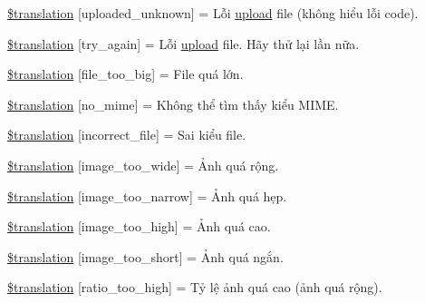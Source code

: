 \begin{DoxyCompactItemize}
\hyperlink{class_8upload_8vn___v_n_8php_a4a9168e922b827e6a28b5db1c00774ca}{\$translation} \mbox{[}\textquotesingle{}uploaded\+\_\+unknown\textquotesingle{}\mbox{]} = \textquotesingle{}Lỗi \hyperlink{classupload}{upload} file (không hiểu lỗi code).\textquotesingle{}
\item 
\hyperlink{class_8upload_8vn___v_n_8php_a3afc377bd803683314f413a814243066}{\$translation} \mbox{[}\textquotesingle{}try\+\_\+again\textquotesingle{}\mbox{]} = \textquotesingle{}Lỗi \hyperlink{classupload}{upload} file. Hãy thử lại lần nữa.\textquotesingle{}
\item 
\hyperlink{class_8upload_8vn___v_n_8php_a476278eb4a0c3df56af068e2d511a741}{\$translation} \mbox{[}\textquotesingle{}file\+\_\+too\+\_\+big\textquotesingle{}\mbox{]} = \textquotesingle{}File quá lớn.\textquotesingle{}
\item 
\hyperlink{class_8upload_8vn___v_n_8php_a191a55df8e3bb7f3c51b70f3c1932e02}{\$translation} \mbox{[}\textquotesingle{}no\+\_\+mime\textquotesingle{}\mbox{]} = \textquotesingle{}Không thể tìm thấy kiểu M\+I\+M\+E.\textquotesingle{}
\item 
\hyperlink{class_8upload_8vn___v_n_8php_a4d32343e2699edd6fd435f9c832cb9c7}{\$translation} \mbox{[}\textquotesingle{}incorrect\+\_\+file\textquotesingle{}\mbox{]} = \textquotesingle{}Sai kiểu file.\textquotesingle{}
\item 
\hyperlink{class_8upload_8vn___v_n_8php_a0dd3e4930ca1f59ae280f4b1006525cd}{\$translation} \mbox{[}\textquotesingle{}image\+\_\+too\+\_\+wide\textquotesingle{}\mbox{]} = \textquotesingle{}Ảnh quá rộng.\textquotesingle{}
\item 
\hyperlink{class_8upload_8vn___v_n_8php_a5c9a4cd67fd21c32e0a3b434591a6037}{\$translation} \mbox{[}\textquotesingle{}image\+\_\+too\+\_\+narrow\textquotesingle{}\mbox{]} = \textquotesingle{}Ảnh quá hẹp.\textquotesingle{}
\item 
\hyperlink{class_8upload_8vn___v_n_8php_aa27bde361343f3b63c7cd441860024f8}{\$translation} \mbox{[}\textquotesingle{}image\+\_\+too\+\_\+high\textquotesingle{}\mbox{]} = \textquotesingle{}Ảnh quá cao.\textquotesingle{}
\item 
\hyperlink{class_8upload_8vn___v_n_8php_a86fcd4e1157b00032df451188d735527}{\$translation} \mbox{[}\textquotesingle{}image\+\_\+too\+\_\+short\textquotesingle{}\mbox{]} = \textquotesingle{}Ảnh quá ngắn.\textquotesingle{}
\item 
\hyperlink{class_8upload_8vn___v_n_8php_a23396f6ce7f31e5e5f1b57580621d982}{\$translation} \mbox{[}\textquotesingle{}ratio\+\_\+too\+\_\+high\textquotesingle{}\mbox{]} = \textquotesingle{}Tỷ lệ ảnh quá cao (ảnh quá rộng).\textquotesingle{}

\end{DoxyCompactItemize}
